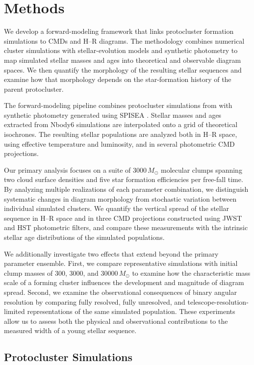 \documentclass[linenumbers, twocolumn]{aastex631}
\begin{document}
\section{Methods} \label{sec:methods}

We develop a forward-modeling framework that links protocluster formation simulations to CMDs and H--R diagrams. The methodology combines numerical cluster simulations with stellar-evolution models and synthetic photometry to map simulated stellar masses and ages into theoretical and observable diagram spaces. We then quantify the morphology of the resulting stellar sequences and examine how that morphology depends on the star-formation history of the parent protocluster.

The forward-modeling pipeline combines protocluster simulations from \citet{Farias2019} with synthetic photometry generated using SPISEA \citep{Hosek2020}. Stellar masses and ages extracted from Nbody6 simulations are interpolated onto a grid of theoretical isochrones. The resulting stellar populations are analyzed both in H--R space, using effective temperature and luminosity, and in several photometric CMD projections.

Our primary analysis focuses on a suite of $3000\,M_\odot$ molecular clumps spanning two cloud surface densities and five star formation efficiencies per free-fall time. By analyzing multiple realizations of each parameter combination, we distinguish systematic changes in diagram morphology from stochastic variation between individual simulated clusters. We quantify the vertical spread of the stellar sequence in H--R space and in three CMD projections constructed using JWST and HST photometric filters, and compare these measurements with the intrinsic stellar age distributions of the simulated populations.

We additionally investigate two effects that extend beyond the primary parameter ensemble. First, we compare representative simulations with initial clump masses of $300$, $3000$, and $30000\,M_\odot$ to examine how the characteristic mass scale of a forming cluster influences the development and magnitude of diagram spread. Second, we examine the observational consequences of binary angular resolution by comparing fully resolved, fully unresolved, and telescope-resolution-limited representations of the same simulated population. These experiments allow us to assess both the physical and observational contributions to the measured width of a young stellar sequence.

\subsection{Protocluster Simulations} \label{sec:protocluster-sims}
\end{document}
